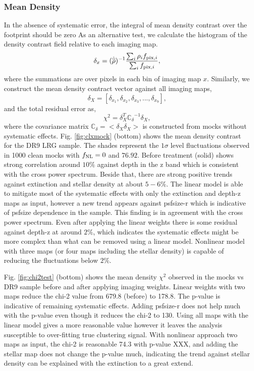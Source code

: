 \subsubsection{Mean Density}
In the absence of systematic error, the integral of mean density contrast over the footprint should be zero As an alternative test, we calculate the histogram of the density contrast field relative to each imaging map.
\begin{equation}
\delta_{x} = ({\hat{\overline{\rho}}})^{-1} \frac{\sum_{i} \rho_{i} f_{{\rm pix}, i}}{\sum_{i} f_{{\rm pix}, i}},
\end{equation}
where the summations are over pixels in each bin of imaging map $x$. Similarly, we construct the mean density contract vector against all imaging maps,
\begin{equation}
\delta_{X} = [\delta_{x_{1}}, \delta_{x_{2}}, \delta_{x_{3}}, ..., \delta_{x_{9}}],
\end{equation}
and the total residual error as,
\begin{equation}
\chi^{2} = \delta_{X}^{T} \mathbb{C_{\delta}}^{-1} \delta_{X},
\end{equation}
where the covariance matrix $\mathbb{C}_{\delta} = < \delta_{X} \delta_{X}>$ is constructed from mocks without systematic effects. Fig. \ref{fig:clxmock} (bottom) shows the mean density contrast for the DR9 LRG sample. The shades represent the $1\sigma$ level fluctuations observed in 1000 clean mocks with $f_{\rm NL}=0$ and $76.92$. Before treatment (solid) shows strong correlation around $10\%$ against depth in the z band which is consistent with the cross power spectrum. Beside that, there are strong positive trends against extinction and stellar density at about $5-6\%$. The linear model is able to mitigate most of the systematic effects with only the extinction and depth-z maps as input, however a new trend appears against psfsize-r which is indicative of psfsize dependence in the sample. This finding is in agreement with the cross power spectrum. Even after applying the linear weights there is some residual against depth-z at around $2\%$, which indicates the systematic effects might be more complex than what can be removed using a linear model. Nonlinear model with three maps (or four maps including the stellar density) is capable of reducing the fluctuations below $2\%$. 


Fig. \ref{fig:chi2test} (bottom) shows the mean density $\chi^{2}$ observed in the mocks vs DR9 sample before and after applying imaging weights. Linear weights with two maps reduce the chi-2 value from 679.8 (before) to 178.8. The p-value is indicative of remaining systematic effects. Adding psfsize-r does not help much with the p-value even though it reduces the chi-2 to 130. Using all maps with the linear model gives a more reasonable value however it leaves the analysis susceptible to over-fitting true clustering signal. With nonlinear approach two maps as input, the chi-2 is reasonable 74.3 with p-value XXX, and adding the stellar map does not change the p-value much, indicating the trend against stellar density can be explained with the extinction to a great extend. 